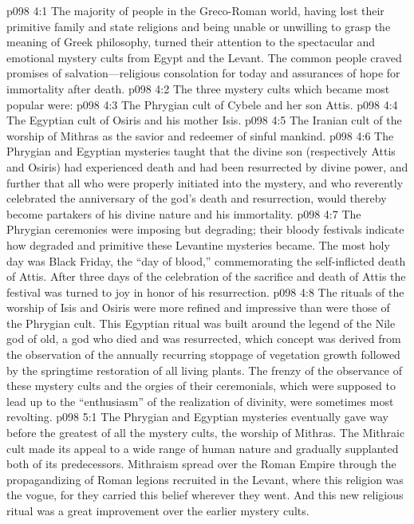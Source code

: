 \vs p098 4:1 The majority of people in the Greco\hyp{}Roman world, having lost their primitive family and state religions and being unable or unwilling to grasp the meaning of Greek philosophy, turned their attention to the spectacular and emotional mystery cults from Egypt and the Levant. The common people craved promises of salvation---religious consolation for today and assurances of hope for immortality after death.
\vs p098 4:2 The three mystery cults which became most popular were:
\pc \vs p098 4:3 \bibnobreakspace The Phrygian cult of Cybele and her son Attis.
\vs p098 4:4 \bibnobreakspace The Egyptian cult of Osiris and his mother Isis.
\vs p098 4:5 \bibnobreakspace The Iranian cult of the worship of Mithras as the savior and redeemer of sinful mankind.
\pc \vs p098 4:6 The Phrygian and Egyptian mysteries taught that the divine son (respectively Attis and Osiris) had experienced death and had been resurrected by divine power, and further that all who were properly initiated into the mystery, and who reverently celebrated the anniversary of the god’s death and resurrection, would thereby become partakers of his divine nature and his immortality.
\pc \vs p098 4:7 The Phrygian ceremonies were imposing but degrading; their bloody festivals indicate how degraded and primitive these Levantine mysteries became. The most holy day was Black Friday, the “day of blood,” commemorating the self\hyp{}inflicted death of Attis. After three days of the celebration of the sacrifice and death of Attis the festival was turned to joy in honor of his resurrection.\plusone
\vs p098 4:8 The rituals of the worship of Isis and Osiris were more refined and impressive than were those of the Phrygian cult. This Egyptian ritual was built around the legend of the Nile god of old, a god who died and was resurrected, which concept was derived from the observation of the annually recurring stoppage of vegetation growth followed by the springtime restoration of all living plants. The frenzy of the observance of these mystery cults and the orgies of their ceremonials, which were supposed to lead up to the “enthusiasm” of the realization of divinity, were sometimes most revolting.
\vs p098 5:1 The Phrygian and Egyptian mysteries eventually gave way before the greatest of all the mystery cults, the worship of Mithras. The Mithraic cult made its appeal to a wide range of human nature and gradually supplanted both of its predecessors. Mithraism spread over the Roman Empire through the propagandizing of Roman legions recruited in the Levant, where this religion was the vogue, for they carried this belief wherever they went. And this new religious ritual was a great improvement over the earlier mystery cults.\minusone
